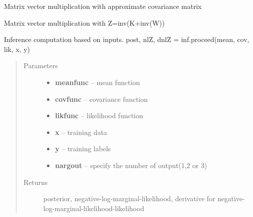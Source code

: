 \documentclass[letterpaper,10pt,english]{sphinxmanual}
\begin{document}
\begin{fulllineitems}
\begin{fulllineitems}
\end{fulllineitems}


\begin{fulllineitems}
\label{pyGPs.Core:pyGPs.Core.inf.Inference.mvmK}
Matrix vector multiplication with approximate covariance matrix

\end{fulllineitems}


\begin{fulllineitems}
\label{pyGPs.Core:pyGPs.Core.inf.Inference.mvmZ}
Matrix vector multiplication with Z=inv(K+inv(W))

\end{fulllineitems}


\begin{fulllineitems}
\label{pyGPs.Core:pyGPs.Core.inf.Inference.proceed}
Inference computation based on inputs.
post, nlZ, dnlZ = inf.proceed(mean, cov, lik, x, y)
\begin{quote}\begin{description}
\item[{Parameters}] \leavevmode\begin{itemize}
\item {} 
\textbf{meanfunc} -- mean function

\item {} 
\textbf{covfunc} -- covariance function

\item {} 
\textbf{likfunc} -- likelihood function

\item {} 
\textbf{x} -- training data

\item {} 
\textbf{y} -- training labels

\item {} 
\textbf{nargout} -- specify the number of output(1,2 or 3)

\end{itemize}

\item[{Returns}] \leavevmode
posterior, negative-log-marginal-likelihood, derivative for negative-log-marginal-likelihood-likelihood

\end{description}\end{quote}

\end{fulllineitems}


\end{fulllineitems}
\end{document}
